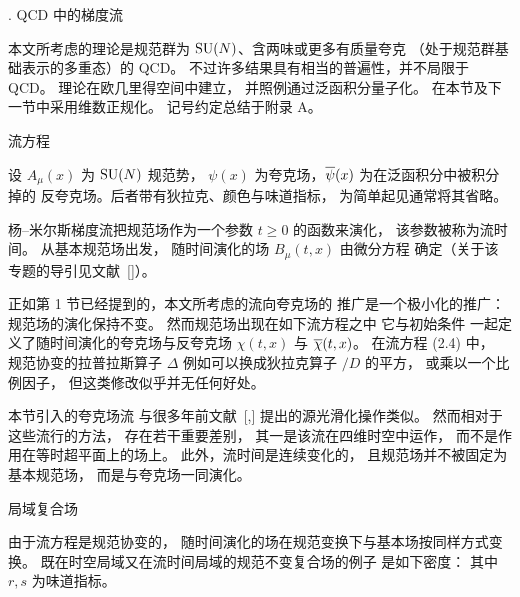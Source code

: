 
. QCD 中的梯度流

本文所考虑的理论是规范群为 ${\rm SU}(N)$、含两味或更多有质量夸克
（处于规范群基础表示的多重态）的 QCD。
不过许多结果具有相当的普遍性，并不局限于 QCD。
理论在欧几里得空间中建立，
并照例通过泛函积分量子化。
在本节及下一节中采用维数正规化。
记号约定总结于附录 A。


 流方程

设 $A_{\mu}(x)$ 为 ${\rm SU}(N)$ 规范势，
$\psi(x)$ 为夸克场，$\overline{\psi}(x)$ 为在泛函积分中被积分掉的
反夸克场。后者带有狄拉克、颜色与味道指标，
为简单起见通常将其省略。

杨--米尔斯梯度流把规范场作为一个参数 $t\geq0$ 的函数来演化，
该参数被称为流时间。
从基本规范场出发，
随时间演化的场 $B_{\mu}(t,x)$ 由微分方程
确定（关于该专题的导引见文献~[\cite{WilsonFlow}]）。

正如第 1 节已经提到的，本文所考虑的流向夸克场的
推广是一个极小化的推广：
规范场的演化保持不变。
然而规范场出现在如下流方程之中\kern1pt
它与初始条件
一起定义了随时间演化的夸克场与反夸克场
$\chi(t,x)$ 与 $\overline{\chi}(t,x)$。
在流方程 (2.4) 中，
规范协变的拉普拉斯算子 $\Delta$
例如可以换成狄拉克算子 $\slash{D}$ 的平方，
或乘以一个比例因子，
但这类修改似乎并无任何好处。

本节引入的夸克场流
与很多年前文献~[\cite{Guesken},\cite{AlexandrouEtAl}]
提出的源光滑化操作类似。
然而相对于这些流行的方法，
存在若干重要差别，
其一是该流在四维时空中运作，
而不是作用在等时超平面上的场上。
此外，流时间是连续变化的，
且规范场并不被固定为基本规范场，
而是与夸克场一同演化。


 局域复合场

由于流方程是规范协变的，
随时间演化的场在规范变换下与基本场按同样方式变换。
既在时空局域又在流时间局域的规范不变复合场的例子
是如下密度：
其中 $r,s$ 为味道指标。

